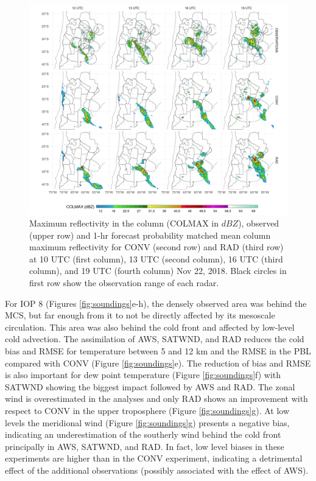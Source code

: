 \documentclass[preprint, 3p, authoryear,review, 12pt]{elsarticle} %
\begin{document}
\begin{figure}[ht]
\includegraphics[width=1\linewidth]{../figures/dbz-mean-1} \caption{Maximum reflectivity in the column (COLMAX in \(dBZ\)), observed (upper row) and 1-hr forecast probability matched mean column maximum reflectivity for CONV (second row) and RAD (third row) at 10 UTC (first column), 13 UTC (second column), 16 UTC (third column), and 19 UTC (fourth column) Nov 22, 2018. Black circles in first row show the observation range of each radar.}\label{fig:dbz-mean}
\end{figure}

For IOP 8 (Figures \ref{fig:soundings}e-h), the densely observed area was behind the MCS, but far enough from it to not be directly affected by its mesoscale circulation. This area was also behind the cold front and affected by low-level cold advection. The assimilation of AWS, SATWND, and RAD reduces the cold bias and RMSE for temperature between 5 and 12 km and the RMSE in the PBL compared with CONV (Figure \ref{fig:soundings}e). The reduction of bias and RMSE is also important for dew point temperature (Figure \ref{fig:soundings}f) with SATWND showing the biggest impact followed by AWS and RAD. The zonal wind is overestimated in the analyses and only RAD shows an improvement with respect to CONV in the upper troposphere (Figure \ref{fig:soundings}g). At low levels the meridional wind (Figure \ref{fig:soundings}g) presents a negative bias, indicating an underestimation of the southerly wind behind the cold front principally in AWS, SATWND, and RAD. In fact, low level biases in these experiments are higher than in the CONV experiment, indicating a detrimental effect of the additional observations (possibly associated with the effect of AWS).
\end{document}

